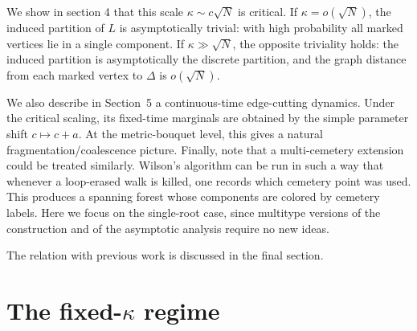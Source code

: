 \documentclass[11pt]{article}
\begin{document}
We show in section 4 that this scale $\kappa\sim c\sqrt N$
 is critical.
If $\kappa=o(\sqrt N)$, the induced partition of $L$
is asymptotically trivial: with high probability
all marked vertices lie in a single component.
If $\kappa\gg\sqrt N$, the opposite triviality holds:
the induced partition is asymptotically the discrete partition,
and the graph distance from each marked vertex to $\Delta$
is $o(\sqrt N)$.

\noindent

We also describe in Section~5 a continuous-time edge-cutting dynamics. Under
the critical scaling, its fixed-time marginals are obtained by the simple
parameter shift \(c\mapsto c+a\). At the metric-bouquet level, this gives a
natural fragmentation/coalescence picture.
 Finally, note that a multi-cemetery extension could be treated similarly. Wilson's
algorithm can be run in such a way that whenever a loop-erased walk is killed,
one records which cemetery point was used. This produces a spanning forest
whose components are colored by cemetery labels. Here we focus on the
single-root case, since multitype versions of the construction and of the
asymptotic analysis require no new ideas.

The relation with previous work is discussed in the final section.

\section{The fixed-\(\kappa\) regime}%
\end{document}

